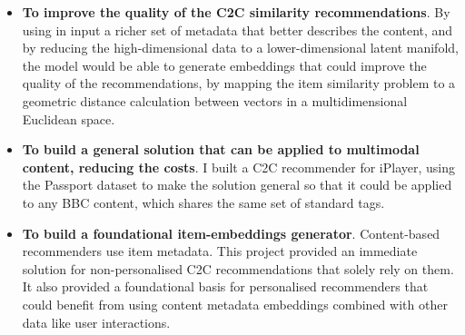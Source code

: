 \begin{itemize}
  \item \textbf{To improve the quality of the C2C similarity recommendations}.
  By using in input a richer set of metadata that better describes the content, and by reducing the high-dimensional data to a lower-dimensional latent manifold,
  the model would be able to generate embeddings that could improve the quality of the recommendations, by mapping the item similarity problem to a geometric
  distance calculation between vectors in a multidimensional Euclidean space.
  \item \textbf{To build a general solution that can be applied to multimodal content, reducing the costs}. I built a C2C recommender for iPlayer,
  using the Passport dataset to make the solution general so that it could be applied to any BBC content,
  which shares the same set of standard tags.
  \item \textbf{To build a foundational item-embeddings generator}. Content-based recommenders use item metadata.
  This project provided an immediate solution for non-personalised C2C recommendations that solely rely on them.
  It also provided a foundational basis for personalised recommenders that could benefit from using content metadata embeddings
  combined with other data like user interactions.
\end{itemize}
